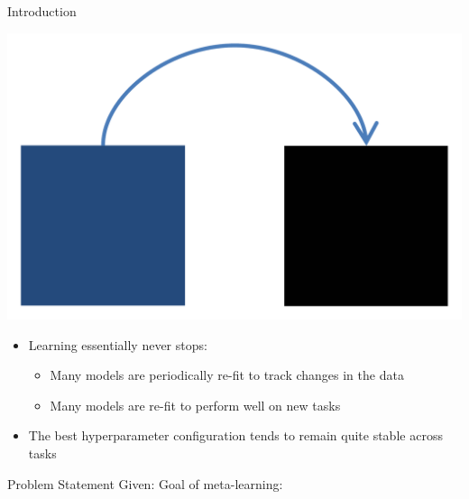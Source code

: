 
\begin{frame}[c]{Introduction}

	\begin{center}
		\includegraphics[width=0.2\linewidth, keepaspectratio=true]{images/intro/meta-learning.png}
	\end{center}
				
	\begin{itemize}
		\item Learning essentially never stops:
		\begin{itemize}
			\item Many models are periodically re-fit to track changes in the data
			\item Many models are re-fit to perform well on new tasks
		\end{itemize}
		\item The best hyperparameter configuration tends to remain quite stable across tasks
	\end{itemize}		
\end{frame}

\begin{frame}[c]{Problem Statement}
		Given:
		\bigskip
\pause
		\alert{Goal of meta-learning:}

\hspace{11cm}
\end{frame}


